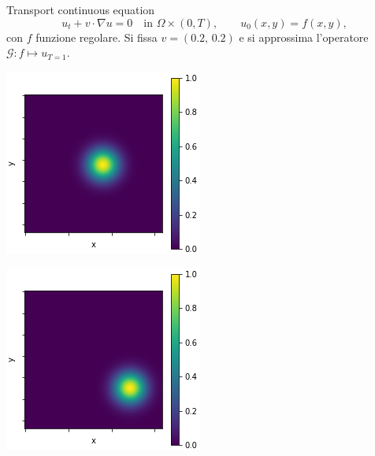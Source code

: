 \documentclass[aspectratio=169]{beamer}
\begin{document}
\begin{frame}[t]{Transport continuous equation}
    \[
    u_{t} + v \cdot \nabla u = 0 \quad \text{in } \Omega \times (0, T), \quad\quad u_{0}(x, y) = f(x, y),
    \]
    con $f$ funzione regolare. Si fissa $v = (0.2, \, 0.2)$ e si approssima l'operatore $\mathcal{G}: f\mapsto u_{T=1}$.
    \begin{center}
        \begin{minipage}{0.24\textwidth}
            \includegraphics[width=\textwidth]{operators/contTrans/input.png}
        \end{minipage}
        \hfill
        \begin{minipage}{0.24\textwidth}
            \includegraphics[width=\textwidth]{operators/contTrans/output.png}

\end{minipage}
\end{center}
\end{frame}
\end{document}
